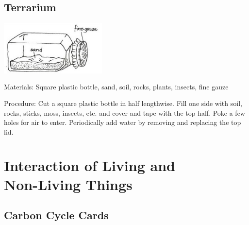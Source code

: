 \begin{multicols}{2}
\subsection{Terrarium}  %

\begin{center}
\includegraphics[width=0.4\textwidth]{./img/vso/terrarium.jpg}
\end{center}

\begin{description*}
\item[Materials:]{Square plastic bottle, sand, soil, rocks, plants, insects, fine gauze}
\item[Procedure:]{Cut a square plastic bottle in half lengthwise. Fill one side with soil, rocks, sticks, moss, insects, etc. and cover and tape with the top half. Poke a few holes for air to enter. Periodically add water by removing and replacing the top lid.}
\end{description*}


\section*{Interaction of Living and \hfill \\ Non-Living Things} 


\subsection{Carbon Cycle Cards}   %


\end{multicols}
